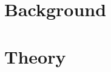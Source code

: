 \documentclass[12pt,a4paper]{report}
\author{
	Sørensen, Casper\\
	\texttt{csare12@student.aau.dk}
	\and
	Christensen, Daniel\\
	\textttt{12@student.aau.dk}
	\and
	Smed, Dina Madsen\\
	\textttt{dsmed12@student.aau.dk}
	\and
	Lind, Rasmus Bloustrød\\
	\textttt{rlind12@student.aau.dk}
	\and
	Vinkel, Simone Patricia \\
	\texttt{svinke12@student.aau.dk}
	Høeg, Emil Rose \\
	\texttt{ehaeg12@student.aau.dk}
}
\begin{document}
\tableofcontents
\chapter{Background}



%

\chapter{Theory}
%
%





\end{document}
